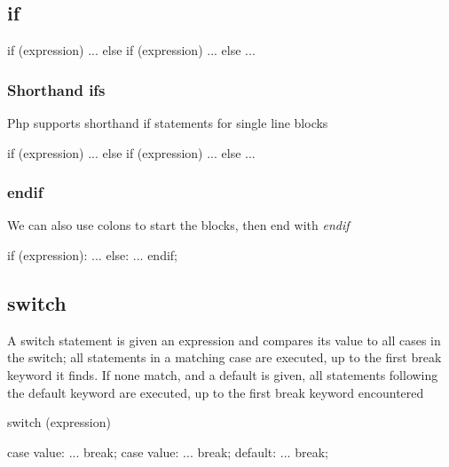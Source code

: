 \documentclass{report}
\begin{document}
\subsection{if}
\bigbreak \noindent 
\begin{phpcode}
    if (expression) {
        ...
    } else if (expression) {
        ...
    } else {
        ...
    }
\end{phpcode}
\bigbreak \noindent 
\subsubsection{Shorthand ifs}
\bigbreak \noindent 
Php supports shorthand if statements for single line blocks
\bigbreak \noindent 
\begin{phpcode}
if (expression) 
    ...
else if (expression)
    ...
else 
    ...
\end{phpcode}

\bigbreak \noindent 
\subsubsection{endif}
\bigbreak \noindent 
We can also use colons to start the blocks, then end with \textit{endif}
\bigbreak \noindent 
\begin{phpcode}
if (expression):    
    ...
else:
    ...
endif;
\end{phpcode}
\bigbreak \noindent 
{}
\bigbreak \noindent 

\bigbreak \noindent 
\subsection{switch}
\bigbreak \noindent 
A switch statement is given an expression and compares its value to all cases in the switch; all statements in a matching case are executed, up to the first break keyword it finds. If none match, and a default is given, all statements following the default keyword are executed, up to the first break keyword encountered
\bigbreak \noindent 
\begin{phpcode}
    switch (expression) {

        case value:
            ...
            break;
        case value:
            ...
            break;
        default:
            ...
            break;

    }
\end{phpcode}
\bigbreak \noindent 
\end{document}
